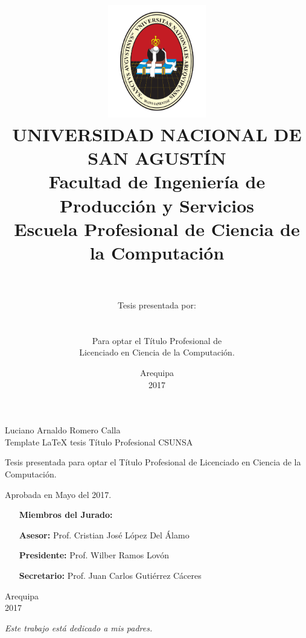 \documentclass[11pt,a4paper]{report}
\title
{
	\includegraphics[width=0.32\textwidth]{figures/unsa}\\\vspace{0.5cm}
	\large UNIVERSIDAD NACIONAL DE SAN AGUSTÍN\\ 
	\sc Facultad de Ingeniería de Producción y Servicios\\ 
	Escuela Profesional de Ciencia de la Computación\\\vspace{3cm}
	\Large\bf\mytitle\\\vspace{1.5cm}
}
\author{Tesis presentada por:\\{\Large\sc\myauthor}\\\\
		Para optar el Título Profesional de\\Licenciado en Ciencia de la Computación.}
\date{\vspace{3cm}\sc Arequipa\\2017}
\theoremstyle{custom}
\numberwithin{mydef}{chapter}
\def\myauthor{Luciano Arnaldo Romero Calla}
\def\mytitle{Template LaTeX tesis Título Profesional CSUNSA}
\begin{document}
\maketitle

\begin{titlepage}
\begin{center}
{\Large\sc\myauthor}\\\vspace{2cm}
{\Large\mytitle}\\\vspace{3cm}
\end{center}
\null\hfill
\begin{minipage}{0.48\textwidth}
\large
Tesis presentada para optar el Título Profesional de
Licenciado en Ciencia de la Computación.
\end{minipage}

\bigskip\vspace{2cm}
\large Aprobada en Mayo del 2017.\\\vspace{2cm}

\null\hfill
\begin{minipage}{0.52\textwidth}
\large
\begin{itemize}
\item[] \textbf{Miembros del Jurado:}
\item[\bf Asesor:] Prof. Cristian José López Del Álamo
\item[\bf Presidente:] Prof. Wilber Ramos Lovón
\item[\bf Secretario:] Prof. Juan Carlos Gutiérrez Cáceres
\end{itemize}
\end{minipage}

\bigskip\vspace{4cm}
\begin{center}
\large\sc Arequipa\\2017
\end{center}
\end{titlepage}

\begin{titlepage}
\null\vfill\null\hfill\em Este trabajo está dedicado a mis padres.
\end{titlepage}

\setlength{\parskip}{1em}

%

\setlength{\parskip}{0em}
\tableofcontents
\listoffigures
\listoftables

\setlength{\parskip}{1em}

\end{document}
